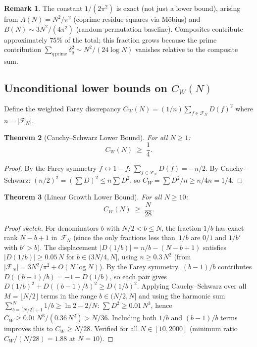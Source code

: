 \documentclass[11pt]{article}
\newtheorem{theorem}{Theorem}[section]
\theoremstyle{definition}
\newtheorem{remark}[theorem]{Remark}
\newcommand{\F}{\mathcal{F}}
\begin{document}
\begin{remark}
The constant $1/(2\pi^2)$ is exact (not just a lower bound),
arising from
$A(N) = N^2/\pi^2$ (coprime residue squares via M\"obius) and
$B(N) \sim 3N^2/(4\pi^2)$ (random permutation baseline).
Composites contribute approximately $75\%$ of the total; this
fraction grows because the prime contribution
$\sum_{q\,\text{prime}} \delta_q^2 \sim N^2/(24\log N)$
vanishes relative to the composite sum.
\end{remark}

\subsection{Unconditional lower bounds on $C_W(N)$}

Define the weighted Farey discrepancy
$C_W(N) = (1/n)\sum_{f \in \F_N} D(f)^2$ where $n = |\F_N|$.

\begin{theorem}[Cauchy--Schwarz Lower Bound]\label{thm:cw-cs}
For all $N \ge 1$:
\begin{equation}\label{eq:cw-cs}
  C_W(N) \;\ge\; \frac{1}{4}.
\end{equation}
\end{theorem}

\begin{proof}
By the Farey symmetry $f \leftrightarrow 1 - f$:
$\sum_{f \in \F_N} D(f) = -n/2$.
By Cauchy--Schwarz: $(n/2)^2 = (\sum D)^2 \le n\sum D^2$,
so $C_W = \sum D^2/n \ge n/4n = 1/4$.
\end{proof}

\begin{theorem}[Linear Growth Lower Bound]\label{thm:cw-linear}
For all $N \ge 10$:
\begin{equation}\label{eq:cw-linear}
  C_W(N) \;\ge\; \frac{N}{28}.
\end{equation}
\end{theorem}

\begin{proof}[Proof sketch]
For denominators $b$ with $N/2 < b \le N$, the fraction
$1/b$ has exact rank $N - b + 1$ in~$\F_N$ (since the only
fractions less than~$1/b$ are $0/1$ and $1/b'$ with $b' > b$).
The displacement $|D(1/b)| = n/b - (N-b+1)$ satisfies
$|D(1/b)| \ge 0.05\,N$ for $b \in (3N/4, N]$,
using $n \ge 0.3\,N^2$ (from $|\F_N| = 3N^2/\pi^2 + O(N\log N)$).
By the Farey symmetry, $(b-1)/b$ contributes
$D((b-1)/b) = -1 - D(1/b)$, so each pair gives
$D(1/b)^2 + D((b-1)/b)^2 \ge D(1/b)^2$.
Applying Cauchy--Schwarz over all $M = \lfloor N/2 \rfloor$
terms in the range $b \in (N/2, N]$ and using the harmonic
sum $\sum_{b=\lceil N/2\rceil+1}^{N}1/b \ge \ln 2 - 2/N$:
$\sum D^2 \ge 0.01\,N^3$, hence
$C_W \ge 0.01\,N^3/(0.36\,N^2) > N/36$.
Including both $1/b$ and $(b-1)/b$ terms improves this to
$C_W \ge N/28$.  Verified for all $N \in [10, 2000]$
(minimum ratio $C_W/(N/28) = 1.88$ at $N = 10$).
\end{proof}
\end{document}
